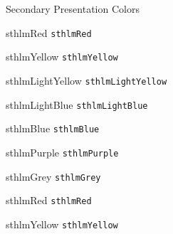 \documentclass[compress]{beamer}
\begin{document}
\begin{frame}{Secondary Presentation Colors}
\begin{multicols}{2}
	
\begin{beamercolorbox}[wd=\linewidth,ht=2ex,dp=0.7ex]{sthlmRed}
	\texttt{sthlmRed}
\end{beamercolorbox}

\begin{beamercolorbox}[wd=\linewidth,ht=2ex,dp=0.7ex]{sthlmYellow}
	\texttt{sthlmYellow}
\end{beamercolorbox}

\begin{beamercolorbox}[wd=\linewidth,ht=2ex,dp=0.7ex]{sthlmLightYellow}
	\texttt{sthlmLightYellow}
\end{beamercolorbox}

\begin{beamercolorbox}[wd=\linewidth,ht=2ex,dp=0.7ex]{sthlmLightBlue}
	\texttt{sthlmLightBlue}
\end{beamercolorbox}

\begin{beamercolorbox}[wd=\linewidth,ht=2ex,dp=0.7ex]{sthlmBlue}
	\texttt{sthlmBlue}
\end{beamercolorbox}

\begin{beamercolorbox}[wd=\linewidth,ht=2ex,dp=0.7ex]{sthlmPurple}
	\texttt{sthlmPurple}
\end{beamercolorbox}

\begin{beamercolorbox}[wd=\linewidth,ht=2ex,dp=0.7ex]{sthlmGrey}
	\texttt{sthlmGrey}
\end{beamercolorbox}



\begin{beamercolorbox}[wd=\linewidth,ht=2ex,dp=0.7ex]{sthlmRed}
	\texttt{sthlmRed}
\end{beamercolorbox}

\begin{beamercolorbox}[wd=\linewidth,ht=2ex,dp=0.7ex]{sthlmYellow}
	\texttt{sthlmYellow}
\end{beamercolorbox}


\end{multicols}
\end{frame}
\end{document}
